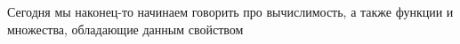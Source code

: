 Сегодня мы наконец-то начинаем говорить про вычислимость, а также функции и множества,
обладающие данным свойством


\begin{minipage}{\textwidth}
    
\end{minipage}

\newpage